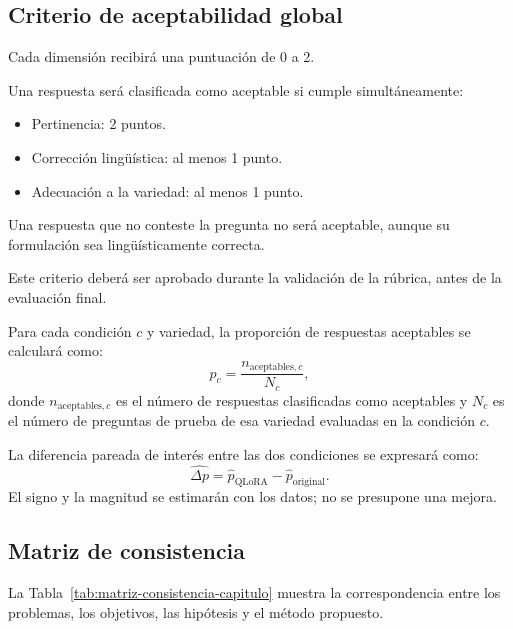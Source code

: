 \subsection{Criterio de aceptabilidad global}\label{criterio-de-aceptabilidad-global}

Cada dimensión recibirá una puntuación de 0 a 2.

Una respuesta será clasificada como aceptable si cumple simultáneamente:

\begin{itemize}
\tightlist
\item
  Pertinencia: 2 puntos.
\item
  Corrección lingüística: al menos 1 punto.
\item
  Adecuación a la variedad: al menos 1 punto.
\end{itemize}

Una respuesta que no conteste la pregunta no será aceptable, aunque su formulación sea lingüísticamente correcta.

Este criterio deberá ser aprobado durante la validación de la rúbrica, antes de la evaluación final.

Para cada condición $c$ y variedad, la proporción de respuestas aceptables se calculará como:
\begin{equation}
\widehat{p}_{c}=\frac{n_{\mathrm{aceptables},c}}{N_c},
\label{eq:proporcion_aceptabilidad}
\end{equation}
donde $n_{\mathrm{aceptables},c}$ es el número de respuestas clasificadas como aceptables y $N_c$ es el número de preguntas de prueba de esa variedad evaluadas en la condición $c$.

La diferencia pareada de interés entre las dos condiciones se expresará como:
\begin{equation}
\widehat{\Delta p}=\widehat{p}_{\mathrm{QLoRA}}-\widehat{p}_{\mathrm{original}}.
\label{eq:efecto_adaptacion}
\end{equation}
El signo y la magnitud se estimarán con los datos; no se presupone una mejora.

\subsection{Matriz de consistencia}\label{matriz-de-consistencia}

La Tabla~\ref{tab:matriz-consistencia-capitulo} muestra la correspondencia entre los problemas, los objetivos, las hipótesis y el método propuesto.

